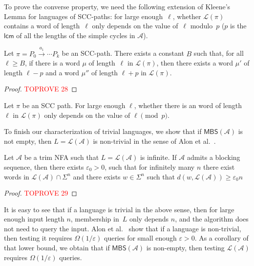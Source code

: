 \documentclass[letterpaper, USenglish, cleveref, autoref, thm-restate, numberwithinsect]{lipics-v2021}
\theoremstyle{theorem}
\theoremstyle{definition}
\newcommand{\Aa}{\mathcal{A}}
\newcommand{\eps}{\varepsilon}
\newcommand{\lang}[1]{\mathcal{L}(#1)}
\newcommand{\lcm}{\mathsf{lcm}}
\newcommand{\MBS}{\textsf{MBS}\xspace}
\newcommand{\SCCpath}{\pi}
\begin{document}
To prove the converse property, we need the following extension of Kleene's Lemma for languages of SCC-paths: for large enough~$\ell$, whether $\lang{\SCCpath}$ contains a word of length~$\ell$ only depends on the value of~$\ell$ modulo~$p$ ($p$ is the $\lcm$ of all the lengths of the simple cycles in $\Aa$).
\begin{lemma}
    Let $\SCCpath = P_0 \xrightarrow{a_1} \cdots P_k$ be an SCC-path.
    There exists a constant $B $ such that, for all $\ell \ge B$, if there is a word $\mu$ of length~$\ell$ in $\lang{\SCCpath}$,
    then there exists a word $\mu'$ of length  $\ell - p$  and a word $\mu''$ of length  $\ell + p$ in $\lang{\SCCpath}$.
\end{lemma}
\begin{proof}\textcolor{red}{TOPROVE 28}\end{proof}
\begin{corollary}\label{lem:fin-dist-iff-modulo}
    Let $\SCCpath$ be an SCC path.
    For large enough $\ell$, whether there is an word of length $\ell$ in $\lang{\SCCpath}$ only depends on the value of $\ell \pmod{p}$.
\end{corollary}

To finish our characterization of trivial languages, we show that if $\MBS(\Aa)$ is not empty, then $L = \lang{\Aa}$ is non-trivial in the sense of Alon et al.~\cite{alon2001regular}.
\begin{lemma}
	\label{lem:charac-trivial}
	Let $\Aa$ be a trim NFA such that $L = \lang{\Aa}$ is infinite.
	If $\Aa$ admits a blocking sequence,
	then there exists $\eps_0 > 0$, such that for infinitely many $n$ there exist words in $\lang{\Aa} \cap \Sigma^n$ and there exists $w \in \Sigma^n$ such that $d(w,\lang{\Aa})\geq \eps_0 n$
\end{lemma}
\begin{proof}\textcolor{red}{TOPROVE 29}\end{proof}

It is easy to see that if a language is trivial in the above sense, then for large enough input length $n$, membership in~$L$ only depends $n$, and the algorithm does not need to query the input.
Alon et al.~\cite{alon2001regular} show that if a language is non-trivial, then testing it requires $\Omega(1/\eps)$ queries for small enough $\eps > 0$.
As a corollary of that lower bound, we obtain that if $\MBS(\Aa)$ is non-empty, then testing $\lang{\Aa}$ requires $\Omega(1/\eps)$ queries.
 
\end{document}
